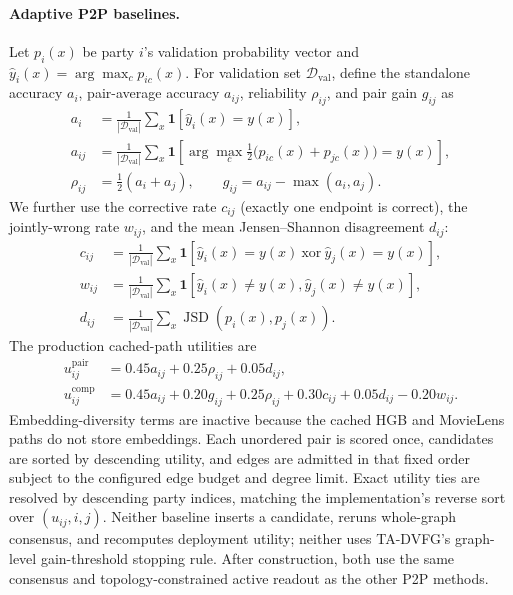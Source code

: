 \documentclass[letterpaper]{article}
\newcommand{\method}{\textsc{TA-DVFG}}
\begin{document}
\paragraph{Adaptive P2P baselines.}
Let $p_i(x)$ be party $i$'s validation probability vector and
$\widehat y_i(x)=\arg\max_c p_{ic}(x)$. For validation set
$\mathcal{D}_{\mathrm{val}}$, define the standalone accuracy $a_i$, pair-average
accuracy $a_{ij}$, reliability $\rho_{ij}$, and pair gain $g_{ij}$ as
\begin{align}
a_i &= \frac{1}{|\mathcal{D}_{\mathrm{val}}|}
\sum_x \mathbf{1}[\widehat y_i(x)=y(x)], \nonumber\\
a_{ij} &= \frac{1}{|\mathcal{D}_{\mathrm{val}}|}
\sum_x \mathbf{1}\!\left[
\arg\max_c \tfrac12\bigl(p_{ic}(x)+p_{jc}(x)\bigr)=y(x)
\right], \nonumber\\
\rho_{ij} &= \tfrac12(a_i+a_j),
\qquad
g_{ij}=a_{ij}-\max(a_i,a_j).
\end{align}
We further use the corrective rate $c_{ij}$ (exactly one endpoint is correct),
the jointly-wrong rate $w_{ij}$, and the mean Jensen--Shannon disagreement
$d_{ij}$:
\begin{align}
c_{ij} &= \frac{1}{|\mathcal{D}_{\mathrm{val}}|}
\sum_x \mathbf{1}[\widehat y_i(x)=y(x)\ \mathrm{xor}\
\widehat y_j(x)=y(x)], \nonumber\\
w_{ij} &= \frac{1}{|\mathcal{D}_{\mathrm{val}}|}
\sum_x \mathbf{1}[\widehat y_i(x)\ne y(x),\widehat y_j(x)\ne y(x)],
\nonumber\\
d_{ij} &= \frac{1}{|\mathcal{D}_{\mathrm{val}}|}
\sum_x \operatorname{JSD}\!\left(p_i(x),p_j(x)\right).
\end{align}
The production cached-path utilities are
\begin{align}
u^{\mathrm{pair}}_{ij}
&=0.45a_{ij}+0.25\rho_{ij}+0.05d_{ij}, \nonumber\\
u^{\mathrm{comp}}_{ij}
&=0.45a_{ij}+0.20g_{ij}+0.25\rho_{ij}
 +0.30c_{ij}+0.05d_{ij}-0.20w_{ij}.
\end{align}
Embedding-diversity terms are inactive because the cached HGB and MovieLens
paths do not store embeddings. Each unordered pair is scored once, candidates
are sorted by descending utility, and edges are admitted in that fixed order
subject to the configured edge budget and degree limit. Exact utility ties are
resolved by descending party indices, matching the implementation's reverse
sort over $(u_{ij},i,j)$. Neither baseline inserts a candidate, reruns
whole-graph consensus, and recomputes deployment utility; neither uses
\method{}'s graph-level gain-threshold stopping rule. After construction, both
use the same consensus and topology-constrained active readout as the other P2P
methods.
\end{document}
